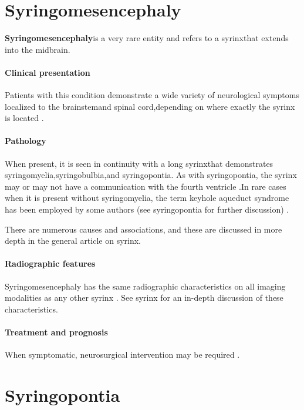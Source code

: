 \section{Syringomesencephaly}

\textbf{Syringomesencephaly}is a very rare entity and refers to a syrinxthat extends into the midbrain.

\paragraph{Clinical presentation}

Patients with this condition demonstrate a wide variety of neurological symptoms localized to the brainstemand spinal cord,depending on where exactly the syrinx is located .


\paragraph{Pathology}

When present, it is seen in continuity with a long syrinxthat demonstrates syringomyelia,syringobulbia,and syringopontia. As with syringopontia, the syrinx may or may not have a communication with the fourth ventricle .In rare cases when it is present without syringomyelia, the term keyhole aqueduct syndrome has been employed by some authors (see syringopontia for further discussion) .

There are numerous causes and associations, and these are discussed in more depth in the general article on syrinx.


\paragraph{Radiographic features}

Syringomesencephaly has the same radiographic characteristics on all imaging modalities as any other syrinx . See syrinx for an in-depth discussion of these characteristics.


\paragraph{Treatment and prognosis}

When symptomatic, neurosurgical intervention may be required .

\section{Syringopontia}

